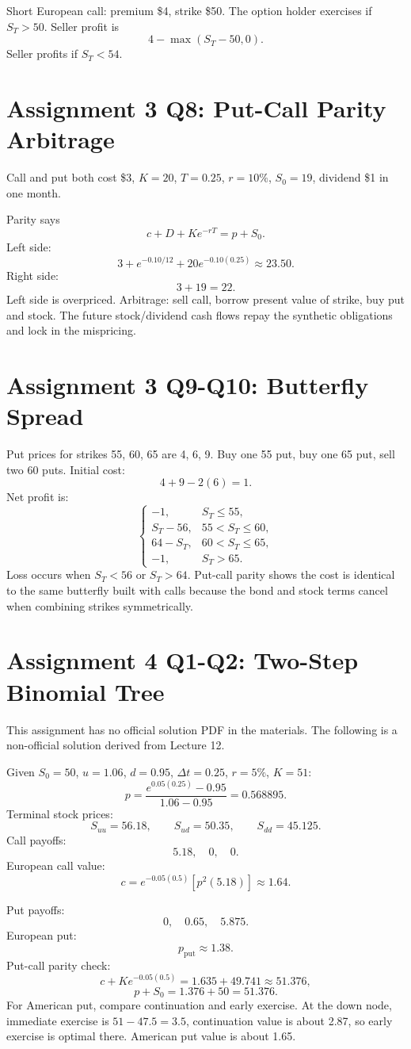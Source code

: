 \documentclass[11pt,a4paper,openany]{ctexbook}
\begin{document}
Short European call: premium \$4, strike \$50. The option holder exercises if $S_T>50$. Seller profit is
\[
4-\max(S_T-50,0).
\]
Seller profits if $S_T<54$.

\section{Assignment 3 Q8: Put-Call Parity Arbitrage}
Call and put both cost \$3, $K=20$, $T=0.25$, $r=10\%$, $S_0=19$, dividend \$1 in one month.

Parity says
\[
c+D+Ke^{-rT}=p+S_0.
\]
Left side:
\[
3+e^{-0.10/12}+20e^{-0.10(0.25)}\approx23.50.
\]
Right side:
\[
3+19=22.
\]
Left side is overpriced. Arbitrage: sell call, borrow present value of strike, buy put and stock. The future stock/dividend cash flows repay the synthetic obligations and lock in the mispricing.

\section{Assignment 3 Q9-Q10: Butterfly Spread}
Put prices for strikes 55, 60, 65 are 4, 6, 9. Buy one 55 put, buy one 65 put, sell two 60 puts. Initial cost:
\[
4+9-2(6)=1.
\]
Net profit is:
\[
\begin{cases}
-1, & S_T\leq55,\\
S_T-56, & 55<S_T\leq60,\\
64-S_T, & 60<S_T\leq65,\\
-1, & S_T>65.
\end{cases}
\]
Loss occurs when $S_T<56$ or $S_T>64$. Put-call parity shows the cost is identical to the same butterfly built with calls because the bond and stock terms cancel when combining strikes symmetrically.

\section{Assignment 4 Q1-Q2: Two-Step Binomial Tree}
This assignment has no official solution PDF in the materials. The following is a non-official solution derived from Lecture 12.

Given $S_0=50$, $u=1.06$, $d=0.95$, $\Delta t=0.25$, $r=5\%$, $K=51$:
\[
p=\frac{e^{0.05(0.25)}-0.95}{1.06-0.95}=0.568895.
\]
Terminal stock prices:
\[
S_{uu}=56.18,\qquad S_{ud}=50.35,\qquad S_{dd}=45.125.
\]
Call payoffs:
\[
5.18,\quad0,\quad0.
\]
European call value:
\[
c=e^{-0.05(0.5)}\left[p^2(5.18)\right]\approx1.64.
\]

Put payoffs:
\[
0,\quad0.65,\quad5.875.
\]
European put:
\[
p_{\text{put}}\approx1.38.
\]
Put-call parity check:
\[
c+Ke^{-0.05(0.5)}=1.635+49.741\approx51.376,
\]
\[
p+S_0=1.376+50=51.376.
\]
For American put, compare continuation and early exercise. At the down node, immediate exercise is $51-47.5=3.5$, continuation value is about 2.87, so early exercise is optimal there. American put value is about 1.65.
\end{document}
